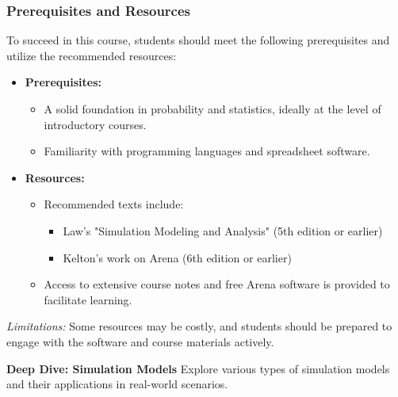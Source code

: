 \subsubsection{Prerequisites and Resources}
To succeed in this course, students should meet the following prerequisites and utilize the recommended resources:
\begin{itemize}
    \item \textbf{Prerequisites:} 
    \begin{itemize}
        \item A solid foundation in probability and statistics, ideally at the level of introductory courses.
        \item Familiarity with programming languages and spreadsheet software.
    \end{itemize}
    \item \textbf{Resources:} 
    \begin{itemize}
        \item Recommended texts include:
        \begin{itemize}
            \item Law's "Simulation Modeling and Analysis" (5th edition or earlier)
            \item Kelton's work on Arena (6th edition or earlier)
        \end{itemize}
        \item Access to extensive course notes and free Arena software is provided to facilitate learning.
    \end{itemize}
\end{itemize}

\textit{Limitations:} Some resources may be costly, and students should be prepared to engage with the software and course materials actively.

\begin{mdframed}[style=detailsstyle]
\textbf{Deep Dive: Simulation Models}
Explore various types of simulation models and their applications in real-world scenarios.
\end{mdframed}
